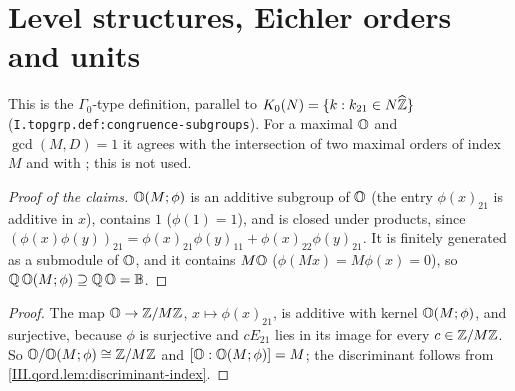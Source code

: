 \section{Level structures, Eichler orders and units}\label{sec:qord-eichler}

\begin{definition}
\end{definition}

\begin{definition}
\end{definition}
\noindent This is the $\Gamma_0$-type definition, parallel to $K_0(N)=\{k:k_{21}\in N\widehat{\mathbb{Z}}\}$ (\texttt{I.topgrp.def:congruence-subgroups}). For a
maximal $\mathbb{O}$ and $\gcd(M,D)=1$ it agrees with the intersection of two maximal orders of index $M$ and with \cite[Def.~1.2]{Piz}; this is not used.
\begin{proof}[Proof of the claims]
$\mathbb{O}(M;\phi)$ is an additive subgroup of $\mathbb{O}$ (the entry $\phi(x)_{21}$ is additive in $x$), contains $1$ ($\phi(1)=1$), and is closed under
products, since $(\phi(x)\phi(y))_{21}=\phi(x)_{21}\phi(y)_{11}+\phi(x)_{22}\phi(y)_{21}$. It is finitely generated as a submodule of $\mathbb{O}$, and it contains
$M\mathbb{O}$ ($\phi(Mx)=M\phi(x)=0$), so $\mathbb{Q}\,\mathbb{O}(M;\phi)\supseteq\mathbb{Q}\,\mathbb{O}=\mathbb{B}$.
\end{proof}

\begin{lemma}
\end{lemma}
\begin{proof}
The map $\mathbb{O}\to\mathbb{Z}/M\mathbb{Z}$, $x\mapsto\phi(x)_{21}$, is additive with kernel $\mathbb{O}(M;\phi)$, and surjective, because $\phi$ is surjective and $cE_{21}$
lies in its image for every $c\in\mathbb{Z}/M\mathbb{Z}$. So $\mathbb{O}/\mathbb{O}(M;\phi)\cong\mathbb{Z}/M\mathbb{Z}$ and $[\mathbb{O}:\mathbb{O}(M;\phi)]=M$; the discriminant follows from
\cref{III.qord.lem:discriminant-index}.
\end{proof}

\begin{definition}
\end{definition}

